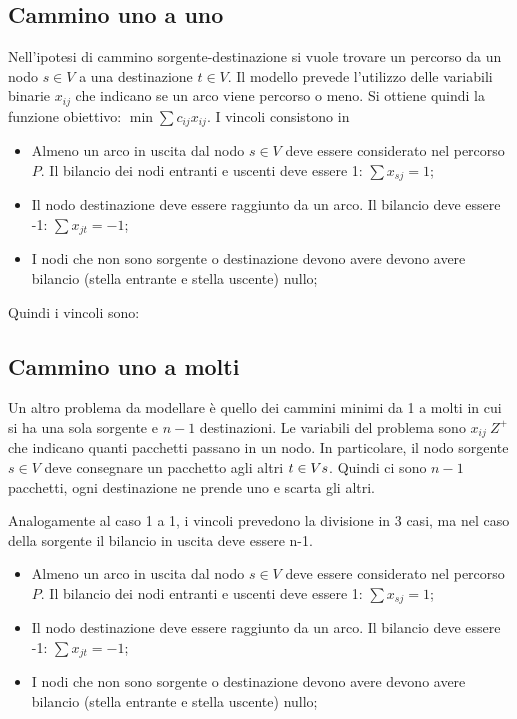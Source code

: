 \documentclass{article}
\begin{document}
\subsection{Cammino uno a uno}
Nell'ipotesi di cammino sorgente-destinazione si vuole trovare un percorso 
da un nodo $s \in V$ a una destinazione $t \in V$. Il modello prevede l'utilizzo 
delle variabili binarie $x_{ij}$ che indicano se un arco viene percorso o meno.
Si ottiene quindi la funzione obiettivo: $\min \sum c_{ij} x_{ij}$. I vincoli 
consistono in 

\begin{itemize}
  \item Almeno un arco in uscita dal nodo $s \in V$ deve essere considerato nel 
    percorso $P$. Il bilancio dei nodi entranti e uscenti deve essere 1:
    $\sum x_{sj} = 1$;
  \item Il nodo destinazione deve essere raggiunto da un arco. Il bilancio deve 
    essere -1: $\sum x_{jt} = -1$;
  \item I nodi che non sono sorgente o destinazione devono avere devono avere 
    bilancio (stella entrante e stella uscente) nullo;
\end{itemize}

Quindi i vincoli sono:

\subsection{Cammino uno a molti}
Un altro problema da modellare è quello dei cammini minimi da 1 a molti in cui
si ha una sola sorgente e $n-1$ destinazioni. Le variabili del problema sono 
$x_{ij} \ Z^+$ che indicano quanti pacchetti passano in un nodo. In particolare,
il nodo sorgente $s \in V$ deve consegnare un pacchetto agli altri $t \in V\\{s}$.
Quindi ci sono $n-1$ pacchetti, ogni destinazione ne prende uno e scarta gli altri.

Analogamente al caso 1 a 1, i vincoli prevedono la divisione in 3 casi, ma nel 
caso della sorgente il bilancio in uscita deve essere n-1. 
\begin{itemize}
  \item Almeno un arco in uscita dal nodo $s \in V$ deve essere considerato nel 
    percorso $P$. Il bilancio dei nodi entranti e uscenti deve essere 1:
    $\sum x_{sj} = 1$;
  \item Il nodo destinazione deve essere raggiunto da un arco. Il bilancio deve 
    essere -1: $\sum x_{jt} = -1$;
  \item I nodi che non sono sorgente o destinazione devono avere devono avere 
    bilancio (stella entrante e stella uscente) nullo;
\end{itemize}
\end{document}
